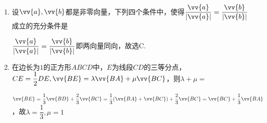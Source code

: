 \begin{enumerate}
        \begin{jieda}
            对于C，若$\vv{a} = \vv{0}, \vv{b} \neq \vv{0}$，则两者共线但C不成立，因此C是两向量共线的充分非必要条件.
        \end{jieda}
        \item 设$\vv{a}, \vv{b}$都是非零向量，下列四个条件中，使得$\dfrac{\vv{a}}{|\vv{a}|} = \dfrac{\vv{b}}{|\vv{b}|}$成立的充分条件是
        \begin{jieda}
            $\dfrac{\vv{a}}{|\vv{a}|} = \dfrac{\vv{b}}{|\vv{b}|}$即两向量同向，故选C.
        \end{jieda}
        
        \item 在边长为$1$的正方形$ABCD$中，$E$为线段$CD$的三等分点，$CE = \dfrac{1}{2}DE, \vv{BE} = \lambda \vv{BA} + \mu \vv{BC}$，则$\lambda + \mu = $
        \begin{jieda}
            $\vv{BE} = \dfrac{1}{3}\vv{BD}+\dfrac{2}{3}\vv{BC} = \dfrac{1}{3}(\vv{BA} + \vv{BC})+\dfrac{2}{3}\vv{BC} = \vv{BC} + \dfrac{1}{3} \vv{BA}$，故$\lambda = \dfrac{1}{3}, \mu = 1$
        \end{jieda}
        

\end{enumerate}
